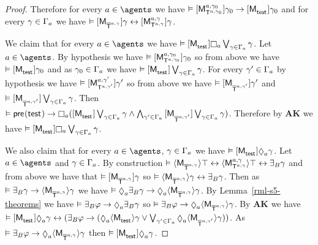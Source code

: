 \begin{proof}
Therefore for every $\agentA \in \agents$ we have $\entails \actionA{\aPModel[\agentA, \gamma_0]{\aStatesT[\agentA, \gamma_0]}} \gamma_0 \implies \actionA{\aPModel{\aStateTest}} \gamma_0$ and
for every $\gamma \in \Gamma_\agentA$ we have $\entails \actionA{\aPModel{\aPStatesT[\agentA, \gamma]}} \gamma \iff \actionA{\aPModel[\agentA, \gamma]{\aStatesT[\agentA, \gamma]}} \gamma$.

We claim that for every $\agentA \in \agents$ we have $\entails \actionA{\aPModel{\aStateTest}} \necessaryA \bigvee_{\gamma \in \Gamma_\agentA} \gamma$.
Let $\agentA \in \agents$.
By hypothesis we have $\entails \actionA{\aPModel[\agentA, \gamma_0]{\aStatesT[\agentA, \gamma_0]}} \gamma_0$ so from above we have $\entails \actionA{\aPModel{\aStateTest}} \gamma_0$ and as $\gamma_0 \in \Gamma_\agentA$ we have $\entails \actionA{\aPModel{\aStateTest}} \bigvee_{\gamma \in \Gamma_\agentA} \gamma$.
For every $\gamma' \in \Gamma_\agentA$ by hypothesis we have $\entails \actionA{\aPModel[\agentA, \gamma']{\aStatesT[\agentA, \gamma']}} \gamma'$ so from above we have $\entails \actionA{\aPModel{\aPStatesT[\agentA, \gamma']}} \gamma'$ and $\entails \actionA{\aPModel{\aPStatesT[\agentA, \gamma']}}  \bigvee_{\gamma \in \Gamma_\agentA} \gamma$.
Then $\entails \aPrecondition(\aStateTest) \implies \necessaryA (\actionA{\aPModel{\aStateTest}} \bigvee_{\gamma \in \Gamma_\agentA} \gamma \land \bigwedge_{\gamma' \in \Gamma_\agentA} \actionA{\aPModel{\aPStatesT[\agentA, \gamma']}} \bigvee_{\gamma \in \Gamma_\agentA} \gamma)$.
Therefore by {\bf AK} we have $\entails \actionA{\aPModel{\aStateTest}} \necessaryA \bigvee_{\gamma \in \Gamma_\agentA} \gamma$.

We also claim that for every $\agentA \in \agents$, $\gamma \in \Gamma_\agentA$ we have $\entails \actionA{\aPModel{\aStateTest}} \possibleA \gamma$.
Let $\agentA \in \agents$ and $\gamma \in \Gamma_\agentA$.
By construction $\entails \actionE{\aPModel{\aPStatesT[\agentA, \gamma]}} \top \iff \actionE{\aPModel[\agentA, \gamma]{\aStatesT[\agentA, \gamma]}} \top \iff \someactsBs \gamma$ and
from above we have that $\entails \actionA{\aPModel{\aPStatesT[\agentA, \gamma]}} \gamma$
so $\entails \actionE{\aPModel{\aPStatesT[\agentA, \gamma]}} \gamma \iff \someactsBs \gamma$.
Then as $\entails \someactsBs \gamma \implies \actionE{\aPModel{\aPStatesT[\agentA, \gamma]}} \gamma$
we have $\entails \possibleA \someactsBs \gamma \implies \possibleA \actionE{\aPModel{\aPStatesT[\agentA, \gamma]}} \gamma$.
By Lemma~\ref{rml-s5-theorems} we have $\entails \someactsBs \phi \implies \possibleA \someactsBs \gamma$ so $\entails \someactsBs \phi \implies \possibleA \actionE{\aPModel{\aPStatesT[\agentA, \gamma]}} \gamma$.
By {\bf AK} we have $\entails \actionA{\aPModel{\aStateTest}} \possibleA \gamma \iff (\someactsBs \phi \implies (\possibleA \actionE{\aPModel{\aStateTest}} \gamma \lor \bigvee_{\gamma' \in \Gamma_\agentA} \possibleA \actionE{\aPModel{\aPStatesT[\agentA, \gamma']}} \gamma))$.
As $\entails \someactsBs \phi \implies \possibleA \actionE{\aPModel{\aPStatesT[\agentA, \gamma]}} \gamma$ then $\entails \actionA{\aPModel{\aStateTest}} \possibleA \gamma$.


\end{proof}
